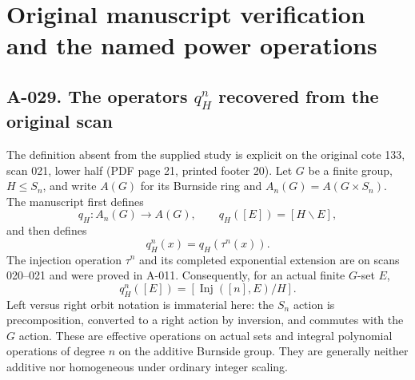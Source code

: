 \section{Original manuscript verification and the named power operations}

\subsection*{A-029. The operators \(q_H^n\) recovered from the original scan}
The definition absent from the supplied study is explicit on the
original cote 133, scan 021, lower half (PDF page 21, printed
footer 20). Let \(G\) be a finite group, \(H\leq S_n\),
and write \(A(G)\) for its Burnside ring and
\(A_n(G)=A(G\times S_n)\). The manuscript first defines
\[
 q_H:A_n(G)\longrightarrow A(G),\qquad
                   q_H([E])=[H\backslash E],                 \tag{A-029.1}
\]
and then defines
\[
                       q_H^n(x)=q_H(\tau^n(x)).                \tag{A-029.2}
\]
The injection operation \(\tau^n\) and its completed exponential
extension are on scans 020--021 and were proved in A-011. Consequently,
for an actual finite \(G\)-set \(E\),
\[
             q_H^n([E])=[\operatorname{Inj}([n],E)/H].          \tag{A-029.3}
\]
Left versus right orbit notation is immaterial here: the \(S_n\)
action is precomposition, converted to a right action by inversion,
and commutes with the \(G\) action. These are effective operations
on actual sets and integral polynomial operations of degree \(n\)
on the additive Burnside group. They are generally neither additive
nor homogeneous under ordinary integer scaling.

